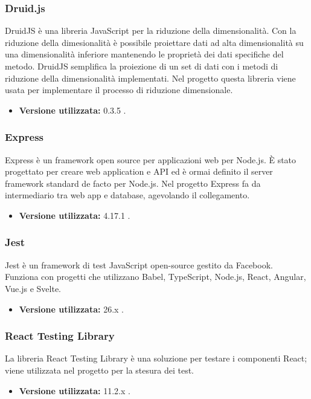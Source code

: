 \subsubsection{Druid.js}
DruidJS è una libreria JavaScript per la riduzione della dimensionalità. Con la riduzione della dimesionalità è possibile proiettare dati ad alta dimensionalità su una dimensionalità inferiore mantenendo le proprietà dei dati specifiche del metodo. DruidJS semplifica la proiezione di un set di dati con i metodi di riduzione della dimensionalità implementati.
Nel progetto \NomeProgetto questa libreria viene usata per implementare il processo di riduzione dimensionale.
\begin{itemize}
\item \textbf{Versione utilizzata:} 0.3.5 .
\end{itemize}
\subsubsection{Express}
Express è un framework open source per applicazioni web per Node.js. È stato progettato per creare web application e API ed è ormai definito il server framework standard de facto per Node.js.
Nel progetto \NomeProgetto Express fa da intermediario tra web app e database, agevolando il collegamento.
\begin{itemize}
\item \textbf{Versione utilizzata:} 4.17.1 .
\end{itemize}
\subsubsection{Jest} 
Jest è un framework di test JavaScript open-source gestito da Facebook. Funziona con progetti che utilizzano Babel, TypeScript, Node.js, React, Angular, Vue.js e Svelte.
\begin{itemize}
\item \textbf{Versione utilizzata:} 26.x .
\end{itemize}
\subsubsection{React Testing Library}
La libreria React Testing Library è una soluzione per testare i componenti React; viene utilizzata nel progetto \NomeProgetto{} per la stesura dei test.
\begin{itemize}
\item \textbf{Versione utilizzata:} 11.2.x .
\end{itemize}